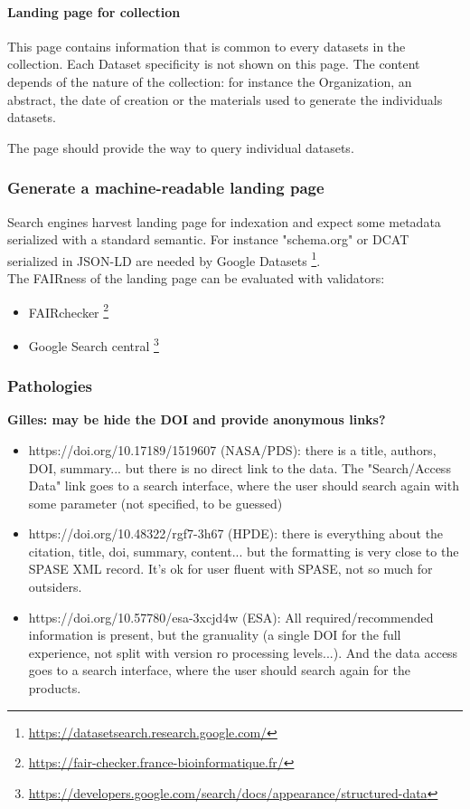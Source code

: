 \documentclass[11pt,a4paper]{ivoa}
\begin{document}
\paragraph{Landing page for collection}
This page contains information that is common to every datasets in the collection. Each Dataset specificity is not shown on this page. The content depends of the nature of the collection: for instance the Organization, an abstract, the date of creation or the materials used to generate the individuals datasets.

The page should provide the way to query individual datasets.

\subsubsection{Generate a machine-readable landing page}
Search engines harvest landing page for indexation and expect some metadata serialized with a standard semantic. For instance "schema.org" or DCAT serialized in JSON-LD are needed by Google Datasets \footnote{\url{https://datasetsearch.research.google.com/}}.\\


The FAIRness of the landing page can be evaluated with validators:
\begin{itemize}
    \item FAIRchecker \footnote{\url{https://fair-checker.france-bioinformatique.fr/}}
    \item Google Search central \footnote{\url{https://developers.google.com/search/docs/appearance/structured-data}}
\end{itemize}


\subsubsection{Pathologies}
\textbf{\color{red} Gilles: may be hide the DOI and provide anonymous links?\\}

\begin{itemize}
    \item https://doi.org/10.17189/1519607 (NASA/PDS): there is a title, authors, DOI, summary... but there is no direct link to the data. The "Search/Access Data" link goes to a search interface, where the user should search again with some parameter (not specified, to be guessed)
    \item https://doi.org/10.48322/rgf7-3h67 (HPDE): there is everything about the citation, title, doi, summary, content... but the formatting is very close to the SPASE XML record. It's ok for user fluent with SPASE, not so much for outsiders.
    \item https://doi.org/10.57780/esa-3xcjd4w (ESA): All required/recommended information is present, but the granuality (a single DOI for the full experience, not split with version ro processing levels...). And the data access goes to a search interface, where the user should search again for the products.
\end{itemize}
\end{document}

